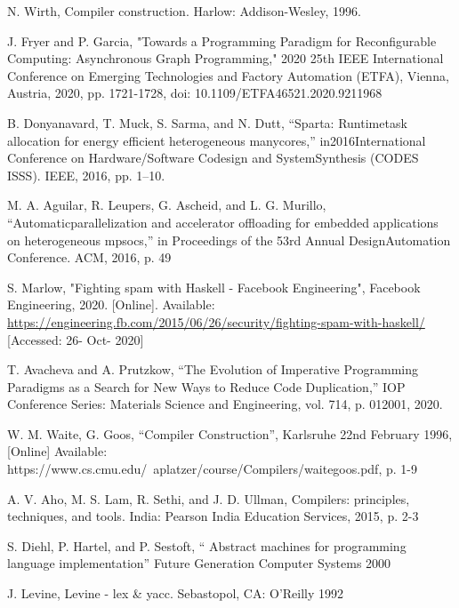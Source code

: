 \documentclass[11pt]{article}
\begin{document}
\begin{thebibliography}{9}

\bibitem{} 
N. Wirth, Compiler construction. Harlow: Addison-Wesley, 1996.

\bibitem{} 
J. Fryer and P. Garcia, "Towards a Programming Paradigm for Reconfigurable Computing: Asynchronous Graph Programming," 2020 25th IEEE International Conference on Emerging Technologies and Factory Automation (ETFA), Vienna, Austria, 2020, pp. 1721-1728, doi: 10.1109/ETFA46521.2020.9211968

\bibitem{}
B. Donyanavard, T. Muck, S. Sarma, and N. Dutt, “Sparta: Runtimetask allocation for energy efficient heterogeneous manycores,” in2016International Conference on Hardware/Software Codesign and SystemSynthesis (CODES  ISSS). IEEE, 2016, pp. 1–10.

\bibitem{}
M. A. Aguilar, R. Leupers, G. Ascheid, and L. G. Murillo, “Automaticparallelization and accelerator offloading for embedded applications on heterogeneous mpsocs,” in Proceedings of the 53rd Annual DesignAutomation Conference. ACM, 2016, p. 49

\bibitem{} 
S. Marlow, "Fighting spam with Haskell - Facebook Engineering", Facebook Engineering, 2020. [Online]. Available: \url{https://engineering.fb.com/2015/06/26/security/fighting-spam-with-haskell/} 
[Accessed: 26- Oct- 2020]

\bibitem{}
T. Avacheva and A. Prutzkow, “The Evolution of Imperative Programming Paradigms as a Search for New Ways to Reduce Code Duplication,” IOP Conference Series: Materials Science and Engineering, vol. 714, p. 012001, 2020.

\bibitem{}
W. M. Waite, G. Goos, “Compiler Construction”, Karlsruhe 22nd February 1996, [Online] Available: https://www.cs.cmu.edu/~aplatzer/course/Compilers/waitegoos.pdf, p. 1-9

\bibitem{}
A. V. Aho, M. S. Lam, R. Sethi, and J. D. Ullman, Compilers: principles, techniques, and tools. India: Pearson India Education Services, 2015, p. 2-3

\bibitem{}
S. Diehl, P. Hartel, and P. Sestoft, “ Abstract machines for programming language implementation” Future Generation Computer Systems 2000


\bibitem{}
J. Levine,  Levine - lex \& yacc. Sebastopol, CA: O’Reilly 1992



\end{thebibliography}
\end{document}
